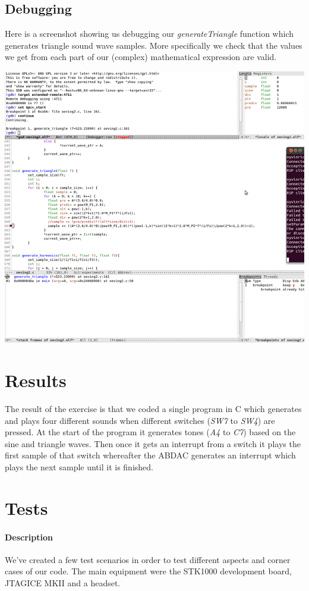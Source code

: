 \documentclass[a4paper,11pt]{article}
\begin{document}
\subsection*{Debugging}
Here is a screenshot showing us debugging our \emph{generateTriangle} function which generates triangle sound wave samples. More specifically we check that the values we get from each part of our (complex) mathematical expression are valid. 
\begin{center}
\includegraphics[scale=1]{images/debugsmall.png}
\end{center}

\section{Results}
The result of the exercise is that we coded a single program in C which generates and plays four different sounds when different switches (\emph{SW7} to \emph{SW4}) are pressed. At the start of the program it generates tones (\emph{A4} to \emph{C7}) based on the sine and triangle waves. Then once it gets an interrupt from a switch it plays the first sample of that switch whereafter the ABDAC generates an interrupt which plays the next sample until it is finished.

\section{Tests}
\paragraph{Description}
We've created a few test scenarios in order to test different aspects and corner cases of our code. The main equipment were the STK1000 development board, JTAGICE MKII and a headset.
\end{document}
